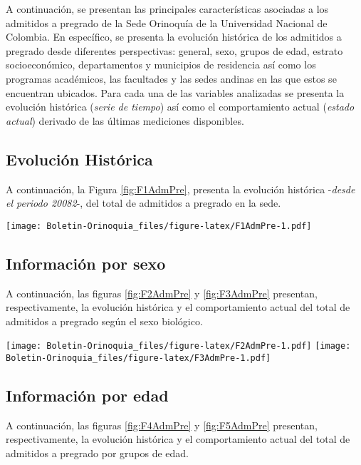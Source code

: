 \documentclass[
]{book}
\begin{document}
A continuación, se presentan las principales características asociadas a los admitidos a pregrado de la Sede Orinoquía de la Universidad Nacional de Colombia. En específico, se presenta la evolución histórica de los admitidos a pregrado desde diferentes perspectivas: general, sexo, grupos de edad, estrato socioeconómico, departamentos y municipios de residencia así como los programas académicos, las facultades y las sedes andinas en las que estos se encuentran ubicados. Para cada una de las variables analizadas se presenta la evolución histórica (\emph{serie de tiempo}) así como el comportamiento actual (\emph{estado actual}) derivado de las últimas mediciones disponibles.

\hypertarget{evoluciuxf3n-histuxf3rica-1}{%
\subsection{Evolución Histórica}\label{evoluciuxf3n-histuxf3rica-1}}

A continuación, la Figura \ref{fig:F1AdmPre}, presenta la evolución histórica -\emph{desde el periodo 20082}-, del total de admitidos a pregrado en la sede.

\texttt{[image: Boletin-Orinoquia\_files/figure-latex/F1AdmPre-1.pdf]}

\hypertarget{informaciuxf3n-por-sexo-1}{%
\subsection{Información por sexo}\label{informaciuxf3n-por-sexo-1}}

A continuación, las figuras \ref{fig:F2AdmPre} y \ref{fig:F3AdmPre} presentan, respectivamente, la evolución histórica y el comportamiento actual del total de admitidos a pregrado según el sexo biológico.

\texttt{[image: Boletin-Orinoquia\_files/figure-latex/F2AdmPre-1.pdf]}
\texttt{[image: Boletin-Orinoquia\_files/figure-latex/F3AdmPre-1.pdf]}

\hypertarget{informaciuxf3n-por-edad-1}{%
\subsection{Información por edad}\label{informaciuxf3n-por-edad-1}}

A continuación, las figuras \ref{fig:F4AdmPre} y \ref{fig:F5AdmPre} presentan, respectivamente, la evolución histórica y el comportamiento actual del total de admitidos a pregrado por grupos de edad.
\end{document}
